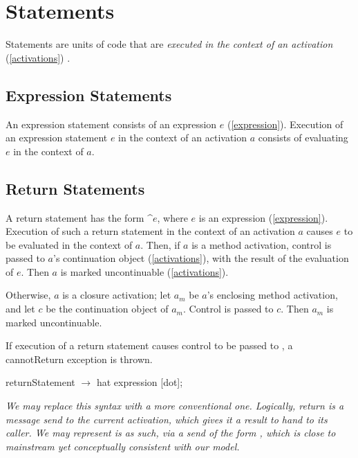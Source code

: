 \documentclass{article}
\newcommand{\code}[1]{{\sf #1}}
\begin{document}
\section{Statements}
\label{statement}

Statements are units of code that are {\em executed in the context of an activation}  (\ref{activations}) .


\subsection{Expression Statements}
\label{expr}

An expression statement consists of an expression $e$  (\ref{expression}). Execution of an expression statement $e$ in the context of an activation $a$ consists of evaluating $e$ in the context of $a$. 


\subsection{Return Statements}
\label{return}

A return statement has the form \^{}$e$, where $e$ is an expression (\ref{expression}). Execution of such a return statement in the context of an activation $a$ causes $e$ to be evaluated in the context of $a$.   Then, if $a$ is a method activation, control is passed to $a$'s continuation object (\ref{activations}), with the result of the evaluation of $e$. Then $a$ is marked uncontinuable (\ref{activations}).

Otherwise, $a$ is a closure activation; let $a_m$ be $a$'s enclosing method activation, and let $c$ be the continuation object of $a_m$.
Control is passed to $c$. Then $a_m$ is marked uncontinuable.

If execution of a return statement causes control to be passed to \NIL{}, a \code{cannotReturn} exception is thrown.

\begin{newspeak}
 returnStatement $\rightarrow$ hat  expression [dot];
\end{newspeak}

{\it
We may replace this syntax with a more conventional one. Logically, return is a message send to the current activation, which gives it a result to hand to its caller. We may represent is as such, via a send of the form , which is close to mainstream yet conceptually consistent with our model.
}
\end{document}
